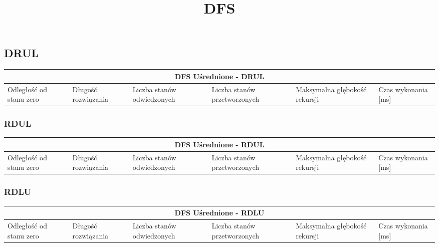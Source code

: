 \documentclass{classrep}
\begin{document}
{\begin{center}
	\title{\textbf{DFS}}
\end{center}

\subsection{DRUL}
\begin{center}
	\begin{tabular}{ | p{1.6cm} | p{1.4cm} | p{1.8cm} | p{2cm} | p{2.2cm} | p{2cm} | }
	\hline
	\multicolumn{6}{|c|}{DFS Uśrednione - DRUL} \\
	\hline
	Odległość od stanu zero & Długość rozwiązania & Liczba stanów odwiedzonych & Liczba stanów przetworzonych & Maksymalna głębokość rekursji & Czas wykonania [ms]\\
	\hline
	
	\hline
	\end{tabular}
\end{center}

\subsubsection{RDUL}
\begin{center}
	\begin{tabular}{ | p{1.6cm} | p{1.4cm} | p{1.8cm} | p{2cm} | p{2.2cm} | p{2cm} | }
	\hline
	\multicolumn{6}{|c|}{DFS Uśrednione - RDUL} \\
	\hline
	Odległość od stanu zero & Długość rozwiązania & Liczba stanów odwiedzonych & Liczba stanów przetworzonych & Maksymalna głębokość rekursji & Czas wykonania [ms]\\
	\hline
	
	\hline
	\end{tabular}
\end{center}

\subsubsection{RDLU}
\begin{center}
	\begin{tabular}{ | p{1.6cm} | p{1.4cm} | p{1.8cm} | p{2cm} | p{2.2cm} | p{2cm} | }
	\hline
	\multicolumn{6}{|c|}{DFS Uśrednione - RDLU} \\
	\hline
	Odległość od stanu zero & Długość rozwiązania & Liczba stanów odwiedzonych & Liczba stanów przetworzonych & Maksymalna głębokość rekursji & Czas wykonania [ms]\\
	\hline
	

\end{tabular}
\end{center}}
\end{document}
